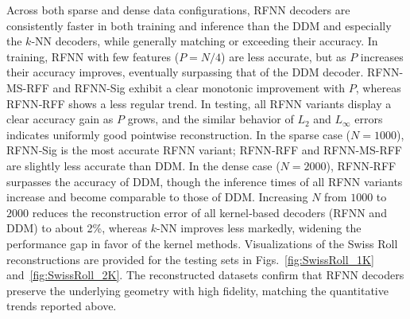 \documentclass{article}
\begin{document}
Across both sparse and dense data configurations, RFNN decoders are consistently faster in both training and inference than the DDM and especially the $k$-NN decoders, while generally matching or exceeding their accuracy. In training, RFNN with few features ($P=N/4$) are less accurate, but as $P$ increases their accuracy improves, eventually surpassing that of the DDM decoder. RFNN-MS-RFF and RFNN-Sig exhibit a clear monotonic improvement with $P$, whereas RFNN‑RFF shows a less regular trend. In testing, all RFNN variants display a clear accuracy gain as $P$ grows, and the similar behavior of $L_2$ and $L_\infty$ errors indicates uniformly good pointwise reconstruction. In the sparse case ($N=1000$), RFNN‑Sig is the most accurate RFNN variant; RFNN‑RFF and RFNN-MS-RFF are slightly less accurate than DDM. In the dense case ($N=2000$), RFNN‑RFF surpasses the accuracy of DDM, though the inference times of all RFNN variants increase and become comparable to those of DDM. Increasing $N$ from $1000$ to $2000$ reduces the reconstruction error of all kernel‑based decoders (RFNN and DDM) to about 2\%, whereas $k$-NN improves less markedly, widening the performance gap in favor of the kernel methods. Visualizations of the Swiss Roll reconstructions are provided for the testing sets in Figs.~\ref{fig:SwissRoll_1K} and~\ref{fig:SwissRoll_2K}. The reconstructed datasets confirm that RFNN decoders preserve the underlying geometry with high fidelity, matching the quantitative trends reported above.
\end{document}
